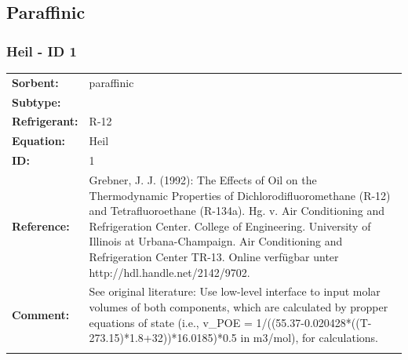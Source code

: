 \subsection{Paraffinic }
%
\subsubsection{Heil - ID 1}
%
\begin{tabular}[l]{|lp{11.5cm}|}
\hline
\addlinespace

\textbf{Sorbent:} & paraffinic \\
\textbf{Subtype:} &  \\
\textbf{Refrigerant:} & R-12 \\
\textbf{Equation:} & Heil \\
\textbf{ID:} & 1 \\
\textbf{Reference:} & Grebner, J. J. (1992): The Effects of Oil on the Thermodynamic Properties of Dichlorodifluoromethane (R-12) and Tetrafluoroethane (R-134a). Hg. v. Air Conditioning and Refrigeration Center. College of Engineering. University of Illinois at Urbana-Champaign. Air Conditioning and Refrigeration Center TR-13. Online verfügbar unter http://hdl.handle.net/2142/9702. \\
\textbf{Comment:} & See original literature: Use low-level interface to input molar volumes of both components, which are calculated by propper equations of state (i.e., v\_POE =  1/((55.37-0.020428*((T-273.15)*1.8+32))*16.0185)*0.5 in m3/mol), for calculations. \\

\addlinespace
\hline
\end{tabular}
\newline

